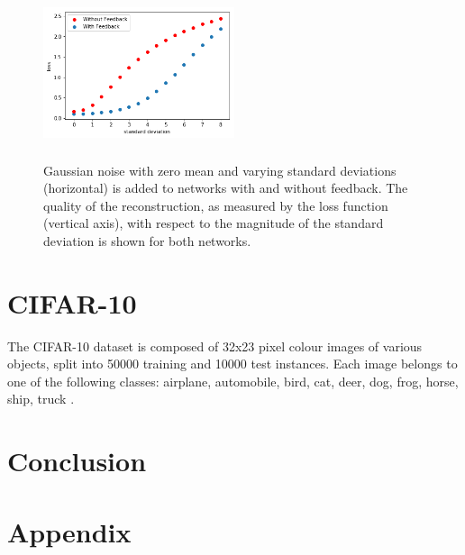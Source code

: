 \documentclass{article}
\begin{document}
  \begin{figure}
      \centering
      \includegraphics[width=0.5\textwidth,height=5cm,keepaspectratio]{img/actnoise_varstd.png}
      \caption{Gaussian noise with zero mean and varying standard deviations (horizontal) is added to networks with and without feedback. The quality of the reconstruction, as measured by the loss function (vertical axis), with respect to the magnitude of the standard deviation is shown for both networks. }
      \label{fig:noiseact}
  \end{figure}

  
\section{CIFAR-10}
The CIFAR-10 dataset is composed of 32x23 pixel colour images of various objects, split into 50000 training and 10000 test instances. Each image belongs to one of the following classes: airplane, automobile, bird, cat, deer, dog, frog, horse, ship, truck \cite{krizhevsky2014cifar}. 
  
\section{Conclusion}




\newpage

\section{Appendix}
\end{document}
